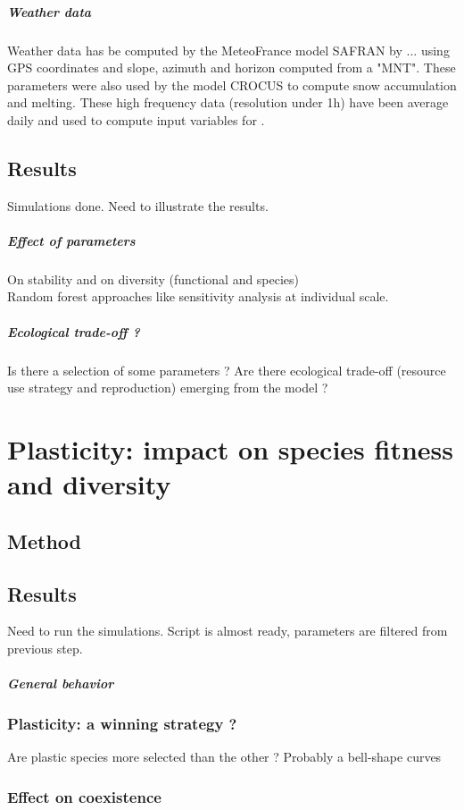 \paragraph{Weather data}
Weather data has be computed by the MeteoFrance model SAFRAN by ... using GPS coordinates and slope, azimuth and horizon computed from a "MNT". These parameters were also used by the model CROCUS to compute snow accumulation and melting. These high frequency data (resolution under 1h) have been average daily and used to compute input variables for \model.

\section{Results}

Simulations done. Need to illustrate the results.\\

\paragraph{Effect of parameters}
On stability and on diversity (functional and species)\\
Random forest approaches like sensitivity analysis at individual scale.

\paragraph{Ecological trade-off ?}
Is there a selection of some parameters ? Are there ecological trade-off (resource use strategy and reproduction) emerging from the model ?

\chapter{Plasticity: impact on species fitness and diversity}

\section{Method}

\section{Results}

Need to run the simulations. Script is almost ready, parameters are filtered from previous step.

\paragraph{General behavior}
\subsection{Plasticity: a winning strategy ?}
Are plastic species more selected than the other ? Probably a bell-shape curves

\subsection{Effect on coexistence}
